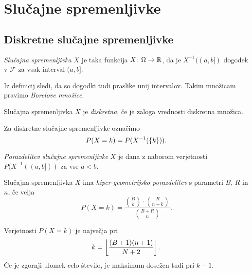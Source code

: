 \section{Slučajne spremenljivke}

\subsection{Diskretne slučajne spremenljivke}


\begin{definicija}
\emph{Slučajna spremenljivka} $X$ je
taka funkcija $X \colon \Omega \to \mathbb{R}$, da je $X^{-1}((a,b])$
dogodek v $\mathcal{F}$ za vsak interval $(a,b]$.
\end{definicija}

\begin{opomba}
Iz definicij sledi, da so dogodki tudi praslike unij intervalov.
Takim množicam pravimo \emph{Borelove množice}.
\end{opomba}

\begin{definicija}
Slučajna spremenljivka $X$ je
\emph{diskretna}, če je
zaloga vrednosti diskretna množica.
\end{definicija}

\begin{opomba}
Za diskretne slučajne spremenljivke označimo
\[
P(X=k) = P(X^{-1}(\left\{k\right\})).
\]
\end{opomba}

\begin{definicija}
\emph{Porazdelitev slučajne spremenljivke}
$X$ je dana z naborom verjetnosti $P(X^{-1}((a,b]))$ za vse $a<b$.
\end{definicija}

\begin{definicija}
Slučajna spremenljivka $X$ ima
\emph{hiper-geometrijsko porazdelitev}
s parametri $B$, $R$ in $n$, če velja
\[
P(X=k) = \frac{\binom{B}{k} \cdot \binom{R}{n-k}}{\binom{B+R}{n}}.
\]
\end{definicija}

\begin{opomba}
Verjetnosti $P(X=k)$ je največja pri
\[
k = \left\lfloor \frac{(B+1)(n+1)}{N+2}\right\rfloor.
\]
Če je zgornji ulomek celo število, je maksimum dosežen tudi pri
$k-1$.
\end{opomba}

